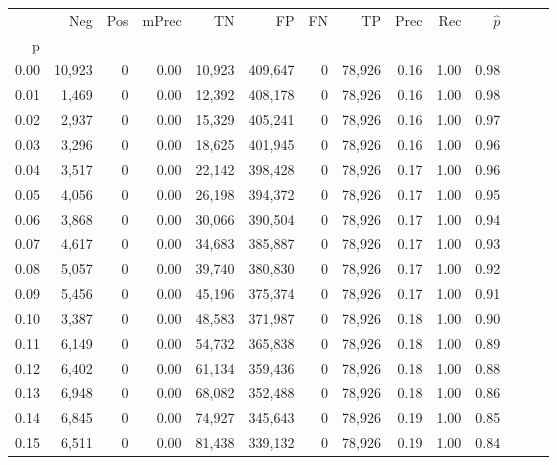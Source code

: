 \begin{tabular}{rrrrrrrrrrrrrr}
\toprule
{} &     Neg &    Pos & mPrec &       TN &       FP &      FN &      TP &  Prec &   Rec & $\hat{p}$ \\
p    &         &        &       &          &          &         &         &       &       &           \\
\midrule
0.00 &  10,923 &      0 &  0.00 &   10,923 &  409,647 &       0 &  78,926 &  0.16 &  1.00 &      0.98 \\
0.01 &   1,469 &      0 &  0.00 &   12,392 &  408,178 &       0 &  78,926 &  0.16 &  1.00 &      0.98 \\
0.02 &   2,937 &      0 &  0.00 &   15,329 &  405,241 &       0 &  78,926 &  0.16 &  1.00 &      0.97 \\
0.03 &   3,296 &      0 &  0.00 &   18,625 &  401,945 &       0 &  78,926 &  0.16 &  1.00 &      0.96 \\
0.04 &   3,517 &      0 &  0.00 &   22,142 &  398,428 &       0 &  78,926 &  0.17 &  1.00 &      0.96 \\
0.05 &   4,056 &      0 &  0.00 &   26,198 &  394,372 &       0 &  78,926 &  0.17 &  1.00 &      0.95 \\
0.06 &   3,868 &      0 &  0.00 &   30,066 &  390,504 &       0 &  78,926 &  0.17 &  1.00 &      0.94 \\
0.07 &   4,617 &      0 &  0.00 &   34,683 &  385,887 &       0 &  78,926 &  0.17 &  1.00 &      0.93 \\
0.08 &   5,057 &      0 &  0.00 &   39,740 &  380,830 &       0 &  78,926 &  0.17 &  1.00 &      0.92 \\
0.09 &   5,456 &      0 &  0.00 &   45,196 &  375,374 &       0 &  78,926 &  0.17 &  1.00 &      0.91 \\
0.10 &   3,387 &      0 &  0.00 &   48,583 &  371,987 &       0 &  78,926 &  0.18 &  1.00 &      0.90 \\
0.11 &   6,149 &      0 &  0.00 &   54,732 &  365,838 &       0 &  78,926 &  0.18 &  1.00 &      0.89 \\
0.12 &   6,402 &      0 &  0.00 &   61,134 &  359,436 &       0 &  78,926 &  0.18 &  1.00 &      0.88 \\
0.13 &   6,948 &      0 &  0.00 &   68,082 &  352,488 &       0 &  78,926 &  0.18 &  1.00 &      0.86 \\
0.14 &   6,845 &      0 &  0.00 &   74,927 &  345,643 &       0 &  78,926 &  0.19 &  1.00 &      0.85 \\
0.15 &   6,511 &      0 &  0.00 &   81,438 &  339,132 &       0 &  78,926 &  0.19 &  1.00 &      0.84 \\

\end{tabular}
